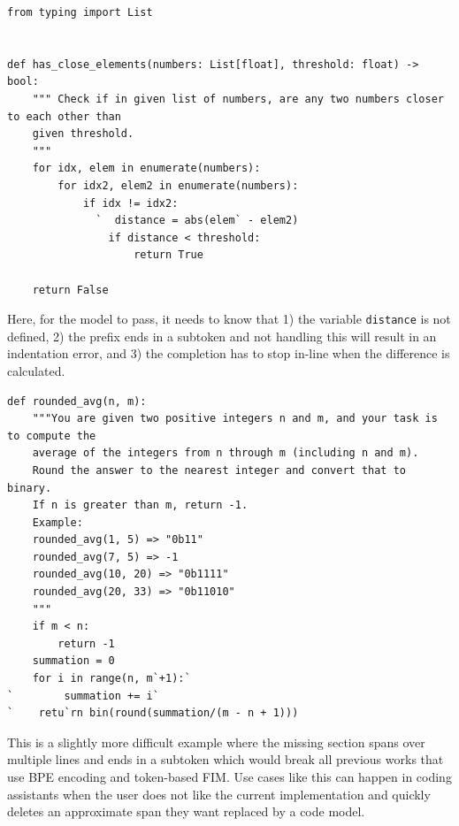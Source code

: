 \documentclass[postscript]{article}
\begin{document}
\vspace{-6pt}
\begin{center}
\begin{minipage}{5in}
\begin{lstlisting}[style=python]
from typing import List


def has_close_elements(numbers: List[float], threshold: float) -> bool:
    """ Check if in given list of numbers, are any two numbers closer to each other than
    given threshold.
    """
    for idx, elem in enumerate(numbers):
        for idx2, elem2 in enumerate(numbers):
            if idx != idx2:
              `  distance = abs(elem` - elem2)
                if distance < threshold:
                    return True

    return False
\end{lstlisting}
\end{minipage}
\end{center}

Here, for the model to pass, it needs to know that 1) the variable \texttt{distance} is not defined, 2) the prefix ends in a subtoken and not handling this will result in an indentation error, and 3) the completion has to stop in-line when the difference is calculated.

\vspace{-6pt}
\begin{center}
\begin{minipage}{5in}
\begin{lstlisting}[style=python]
def rounded_avg(n, m):
    """You are given two positive integers n and m, and your task is to compute the
    average of the integers from n through m (including n and m). 
    Round the answer to the nearest integer and convert that to binary.
    If n is greater than m, return -1.
    Example:
    rounded_avg(1, 5) => "0b11"
    rounded_avg(7, 5) => -1
    rounded_avg(10, 20) => "0b1111"
    rounded_avg(20, 33) => "0b11010"
    """
    if m < n:
        return -1
    summation = 0
    for i in range(n, m`+1):`
`        summation += i`
`    retu`rn bin(round(summation/(m - n + 1)))
\end{lstlisting}
\end{minipage}
\end{center}

This is a slightly more difficult example where the missing section spans over multiple lines and ends in a subtoken which would break all previous works that use BPE encoding and token-based FIM. Use cases like this can happen in coding assistants when the user does not like the current implementation and quickly deletes an approximate span they want replaced by a code model.
\end{document}

